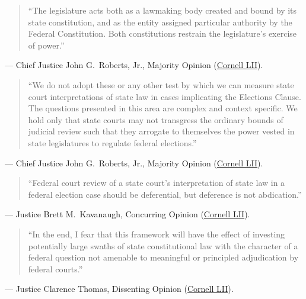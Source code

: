 \documentclass[12pt]{article}
\begin{document}
\begin{quote}
``The legislature acts both as a lawmaking body created and bound by its state constitution, and as the entity assigned particular authority by the Federal Constitution. Both constitutions restrain the legislature's exercise of power.''
\end{quote}
\noindent --- Chief Justice John G.\ Roberts, Jr., Majority Opinion (\href{https://www.law.cornell.edu/supremecourt/text/21-1271}{Cornell LII}).

\begin{quote}
``We do not adopt these or any other test by which we can measure state court interpretations of state law in cases implicating the Elections Clause. The questions presented in this area are complex and context specific. We hold only that state courts may not transgress the ordinary bounds of judicial review such that they arrogate to themselves the power vested in state legislatures to regulate federal elections.''
\end{quote}
\noindent --- Chief Justice John G.\ Roberts, Jr., Majority Opinion (\href{https://www.law.cornell.edu/supremecourt/text/21-1271}{Cornell LII}).

\begin{quote}
``Federal court review of a state court's interpretation of state law in a federal election case should be deferential, but deference is not abdication.''
\end{quote}
\noindent --- Justice Brett M.\ Kavanaugh, Concurring Opinion (\href{https://www.law.cornell.edu/supremecourt/text/21-1271}{Cornell LII}).

\begin{quote}
``In the end, I fear that this framework will have the effect of investing potentially large swaths of state constitutional law with the character of a federal question not amenable to meaningful or principled adjudication by federal courts.''
\end{quote}
\noindent --- Justice Clarence Thomas, Dissenting Opinion (\href{https://www.law.cornell.edu/supremecourt/text/21-1271}{Cornell LII}).
\end{document}
